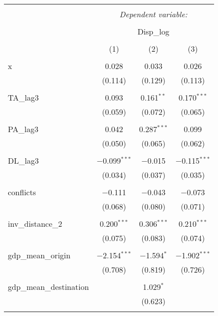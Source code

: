 
\begin{table}[!htbp] \centering 
  \caption{} 
  \label{} 
\begin{tabular}{@{\extracolsep{5pt}}lccc} 
\\[-1.8ex]\hline 
\hline \\[-1.8ex] 
 & \multicolumn{3}{c}{\textit{Dependent variable:}} \\ 
\cline{2-4} 
\\[-1.8ex] & \multicolumn{3}{c}{Disp\_log} \\ 
\\[-1.8ex] & (1) & (2) & (3)\\ 
\hline \\[-1.8ex] 
 x & 0.028 & 0.033 & 0.026 \\ 
  & (0.114) & (0.129) & (0.113) \\ 
  & & & \\ 
 TA\_lag3 & 0.093 & 0.161$^{**}$ & 0.170$^{***}$ \\ 
  & (0.059) & (0.072) & (0.065) \\ 
  & & & \\ 
 PA\_lag3 & 0.042 & 0.287$^{***}$ & 0.099 \\ 
  & (0.050) & (0.065) & (0.062) \\ 
  & & & \\ 
 DL\_lag3 & $-$0.099$^{***}$ & $-$0.015 & $-$0.115$^{***}$ \\ 
  & (0.034) & (0.037) & (0.035) \\ 
  & & & \\ 
 conflicts & $-$0.111 & $-$0.043 & $-$0.073 \\ 
  & (0.068) & (0.080) & (0.071) \\ 
  & & & \\ 
 inv\_distance\_2 & 0.200$^{***}$ & 0.306$^{***}$ & 0.210$^{***}$ \\ 
  & (0.075) & (0.083) & (0.074) \\ 
  & & & \\ 
 gdp\_mean\_origin & $-$2.154$^{***}$ & $-$1.594$^{*}$ & $-$1.902$^{***}$ \\ 
  & (0.708) & (0.819) & (0.726) \\ 
  & & & \\ 
 gdp\_mean\_destination &  & 1.029$^{*}$ &  \\ 
  &  & (0.623) &  \\ 
  & & & \\ 

\end{tabular}
\end{table}
